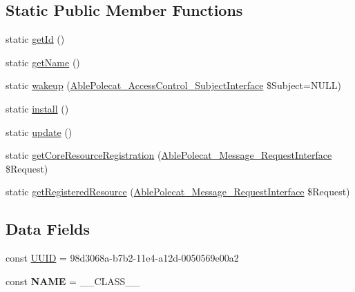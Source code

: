 \subsection*{Static Public Member Functions}
\begin{DoxyCompactItemize}
\item 
static \hyperlink{class_able_polecat___registry___resource_acfaa3a96d0cb5a4c0d4d710dcba41e9e}{get\+Id} ()
\item 
static \hyperlink{class_able_polecat___registry___resource_a4ef9bd37ba3ce8a13c1e8bcf4f72a630}{get\+Name} ()
\item 
static \hyperlink{class_able_polecat___registry___resource_a3f2135f6ad45f51d075657f6d20db2cd}{wakeup} (\hyperlink{interface_able_polecat___access_control___subject_interface}{Able\+Polecat\+\_\+\+Access\+Control\+\_\+\+Subject\+Interface} \$Subject=N\+U\+L\+L)
\item 
static \hyperlink{class_able_polecat___registry___resource_a7ee9452dbd39de4bfbe7a6dd9ed7bb65}{install} ()
\item 
static \hyperlink{class_able_polecat___registry___resource_a00ce4d238d0651db584337f8e0b38c68}{update} ()
\item 
static \hyperlink{class_able_polecat___registry___resource_a0ecbd743e77227ea6000faf76bb30d02}{get\+Core\+Resource\+Registration} (\hyperlink{interface_able_polecat___message___request_interface}{Able\+Polecat\+\_\+\+Message\+\_\+\+Request\+Interface} \$Request)
\item 
static \hyperlink{class_able_polecat___registry___resource_aaee10d6aa95192fbb916de38a202d913}{get\+Registered\+Resource} (\hyperlink{interface_able_polecat___message___request_interface}{Able\+Polecat\+\_\+\+Message\+\_\+\+Request\+Interface} \$Request)
\end{DoxyCompactItemize}
\subsection*{Data Fields}
\begin{DoxyCompactItemize}
\item 
const \hyperlink{class_able_polecat___registry___resource_a74b892c8c0b86bf9d04c5819898c51e7}{U\+U\+I\+D} = \textquotesingle{}98d3068a-\/b7b2-\/11e4-\/a12d-\/0050569e00a2\textquotesingle{}
\item 
\hypertarget{class_able_polecat___registry___resource_a244352f035b82b20b0efa506167fd862}{}const {\bfseries N\+A\+M\+E} = \+\_\+\+\_\+\+C\+L\+A\+S\+S\+\_\+\+\_\+\label{class_able_polecat___registry___resource_a244352f035b82b20b0efa506167fd862}

\end{DoxyCompactItemize}
